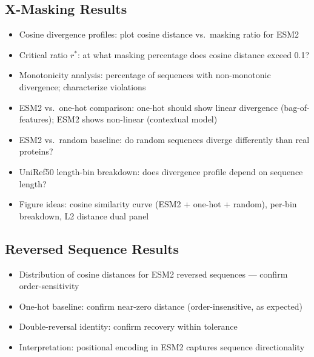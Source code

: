 \subsection{X-Masking Results}\label{sec:eval-xmasking}
\begin{itemize}
  \item Cosine divergence profiles: plot cosine distance vs.\ masking ratio for ESM2
  \item Critical ratio $r^*$: at what masking percentage does cosine distance exceed 0.1?
  \item Monotonicity analysis: percentage of sequences with non-monotonic divergence; characterize violations
  \item ESM2 vs.\ one-hot comparison: one-hot should show linear divergence (bag-of-features); ESM2 shows non-linear (contextual model)
  \item ESM2 vs.\ random baseline: do random sequences diverge differently than real proteins?
  \item UniRef50 length-bin breakdown: does divergence profile depend on sequence length?
  \item Figure ideas: cosine similarity curve (ESM2 + one-hot + random), per-bin breakdown, L2 distance dual panel
\end{itemize}

\subsection{Reversed Sequence Results}\label{sec:eval-reversal}
\begin{itemize}
  \item Distribution of cosine distances for ESM2 reversed sequences --- confirm order-sensitivity
  \item One-hot baseline: confirm near-zero distance (order-insensitive, as expected)
  \item Double-reversal identity: confirm recovery within tolerance
  \item Interpretation: positional encoding in ESM2 captures sequence directionality
\end{itemize}

